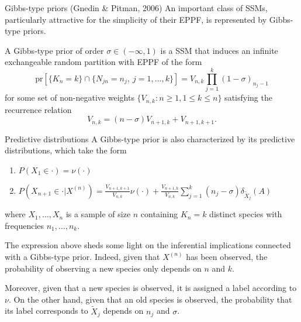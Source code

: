 \documentclass[11pt, handout]{beamer}
\begin{document}
\begin{frame}{Gibbs-type priors (Gnedin \& Pitman, 2006)}
    An important class of SSMs, particularly attractive for the simplicity of their EPPF, is represented by Gibbs-type priors.
    \begin{definition}
        A Gibbs-type prior of order \(\sigma \in (-\infty, 1)\) is a SSM that induces an infinite exchangeable random partition with EPPF of the form
        \begin{equation*}
            \text{pr}[\{K_n = k\} \cap \{N_{jn} = n_j,\ j = 1,...,k\}] = V_{n,k} \prod_{j=1}^k (1 - \sigma)_{n_j - 1}
        \end{equation*}
        for some set of non-negative weights \(\{V_{n, k} \colon n \geq 1, 1 \leq k \leq n\}\) satisfying the recurrence relation
        \begin{equation*}
            V_{n, k} = (n - \sigma) V_{n +1, k} + V_{n + 1, k + 1}.
        \end{equation*}
    \end{definition}
\end{frame}

\begin{frame}{Predictive distributions}
    A Gibbs-type prior is also characterized by its predictive distributions, which take the form
    \begin{enumerate}
        \item \(P(X_1 \in \cdot) = \nu(\cdot)\)
        \item \(P(X_{n + 1} \in \cdot | X^{(n)}) = \frac{V_{n+1,k+1}}{V_{n,k}} \nu(\cdot) + \frac{V_{n+1,k}}{V_{n, k}} \sum_{j = 1}^k (n_j - \sigma) \delta_{\tilde{X}_j}(A)\)
    \end{enumerate}
    where \(X_1,...,X_n\) is a sample of size \(n\) containing \(K_n = k\) distinct species with frequencies \(n_1,...,n_k\).
    \medskip

    The expression above sheds some light on the inferential implications connected with a Gibbs-type prior. Indeed, given that \(X^{(n)}\) has been observed, the probability of observing a new species only depends on \(n\) and \(k\). 
    \medskip
    
    Moreover, given that a new species is observed, it is assigned a label according to \(\nu\). On the other hand, given that an old species is observed, the probability that its label corresponds to \(\tilde{X}_j\) depends on \(n_j\) and \(\sigma\).
\end{frame}
\end{document}
